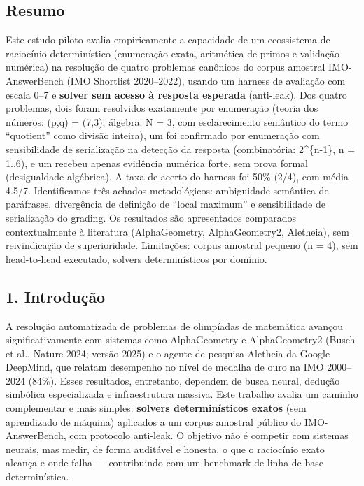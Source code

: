 \documentclass[11pt,a4paper]{article}
\title{}
\author{}
\date{}
\begin{document}
\maketitle
\subsection{Resumo}\label{resumo}

Este estudo piloto avalia empiricamente a capacidade de um ecossistema
de raciocínio determinístico (enumeração exata, aritmética de primos e
validação numérica) na resolução de quatro problemas canônicos do corpus
amostral IMO-AnswerBench (IMO Shortlist 2020--2022), usando um harness
de avaliação com escala 0--7 e \textbf{solver sem acesso à resposta
esperada} (anti-leak). Dos quatro problemas, dois foram resolvidos
exatamente por enumeração (teoria dos números: (p,q) = (7,3); álgebra: N
= 3, com esclarecimento semântico do termo ``quotient'' como divisão
inteira), um foi confirmado por enumeração com sensibilidade de
serialização na detecção da resposta (combinatória: 2\^{}\{n-1\}, n =
1..6), e um recebeu apenas evidência numérica forte, sem prova formal
(desigualdade algébrica). A taxa de acerto do harness foi 50\% (2/4),
com média 4.5/7. Identificamos três achados metodológicos: ambiguidade
semântica de paráfrases, divergência de definição de ``local maximum'' e
sensibilidade de serialização do grading. Os resultados são apresentados
comparados contextualmente à literatura (AlphaGeometry, AlphaGeometry2,
Aletheia), sem reivindicação de superioridade. Limitações: corpus
amostral pequeno (n = 4), sem head-to-head executado, solvers
determinísticos por domínio.

\subsection{1. Introdução}\label{introduuxe7uxe3o}

A resolução automatizada de problemas de olimpíadas de matemática
avançou significativamente com sistemas como AlphaGeometry e
AlphaGeometry2 (Busch et al., Nature 2024; versão 2025) e o agente de
pesquisa Aletheia da Google DeepMind, que relatam desempenho no nível de
medalha de ouro na IMO 2000--2024 (84\%). Esses resultados, entretanto,
dependem de busca neural, dedução simbólica especializada e
infraestrutura massiva. Este trabalho avalia um caminho complementar e
mais simples: \textbf{solvers determinísticos exatos} (sem aprendizado
de máquina) aplicados a um corpus amostral público do IMO-AnswerBench,
com protocolo anti-leak. O objetivo não é competir com sistemas neurais,
mas medir, de forma auditável e honesta, o que o raciocínio exato
alcança e onde falha --- contribuindo com um benchmark de linha de base
determinística.
\end{document}
